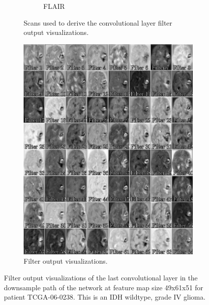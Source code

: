 \begin{subappendices}
\begin{figure}
\begin{subfigure}[b]{0.88\textwidth}
\begin{subfigure}[b]{0.24\textwidth}
        \caption*{\acrshort{FLAIR}}
        \end{subfigure}
        \caption{Scans used to derive the convolutional layer filter output visualizations.}
    \end{subfigure}
    \begin{subfigure}[b]{0.9\textwidth}
        \centering
        \includegraphics[width=\textwidth]{Figures/conv_filter_HGG_shallow.pdf}
        \caption{Filter output visualizations.}
    \end{subfigure}
    \caption{Filter output visualizations of the last convolutional layer in the downsample path of the network at feature map size 49x61x51 for patient TCGA-06-0238.
    This is an IDH wildtype, grade IV glioma.}\label{fig:filter_hgg_shallow}
\end{figure}


\end{subappendices}
